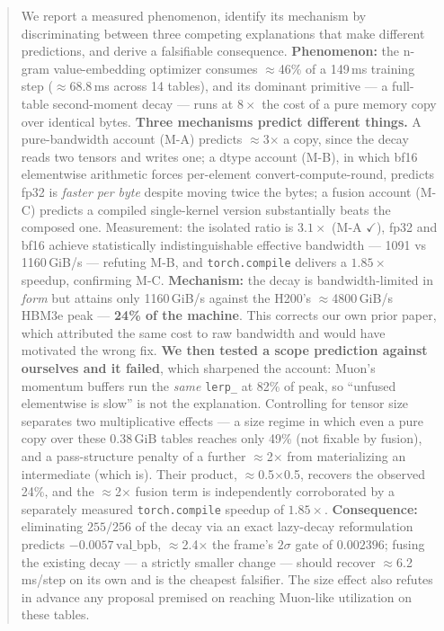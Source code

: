 \documentclass{article}
\newcommand{\vb}{\mathrm{val\_bpb}}
\begin{document}
\printAffiliationsAndNotice{}

\begin{abstract}
We report a measured phenomenon, identify its mechanism by discriminating between three competing explanations that make different predictions, and derive a falsifiable consequence. \textbf{Phenomenon:} the n-gram value-embedding optimizer consumes $\approx$46\% of a 149\,ms training step ($\approx$68.8\,ms across 14 tables), and its dominant primitive --- a full-table second-moment decay --- runs at $8\times$ the cost of a pure memory copy over identical bytes. \textbf{Three mechanisms predict different things.} A pure-bandwidth account (M-A) predicts $\approx$3$\times$ a copy, since the decay reads two tensors and writes one; a dtype account (M-B), in which bf16 elementwise arithmetic forces per-element convert-compute-round, predicts fp32 is \emph{faster per byte} despite moving twice the bytes; a fusion account (M-C) predicts a compiled single-kernel version substantially beats the composed one. Measurement: the isolated ratio is $3.1\times$ (M-A $\checkmark$), fp32 and bf16 achieve statistically indistinguishable effective bandwidth --- 1091 vs 1160\,GiB/s --- refuting M-B, and \texttt{torch.compile} delivers a $1.85\times$ speedup, confirming M-C. \textbf{Mechanism:} the decay is bandwidth-limited in \emph{form} but attains only 1160\,GiB/s against the H200's $\approx$4800\,GiB/s HBM3e peak --- \textbf{24\% of the machine}. This corrects our own prior paper, which attributed the same cost to raw bandwidth and would have motivated the wrong fix. \textbf{We then tested a scope prediction against ourselves and it failed}, which sharpened the account: Muon's momentum buffers run the \emph{same} \texttt{lerp\_} at 82\% of peak, so ``unfused elementwise is slow'' is not the explanation. Controlling for tensor size separates two multiplicative effects --- a size regime in which even a pure copy over these 0.38\,GiB tables reaches only 49\% (not fixable by fusion), and a pass-structure penalty of a further $\approx$2$\times$ from materializing an intermediate (which is). Their product, $\approx$0.5$\times$0.5, recovers the observed 24\%, and the $\approx$2$\times$ fusion term is independently corroborated by a separately measured \texttt{torch.compile} speedup of $1.85\times$. \textbf{Consequence:} eliminating $255/256$ of the decay via an exact lazy-decay reformulation predicts $-0.0057$\,$\vb$, $\approx$2.4$\times$ the frame's $2\sigma$ gate of $0.002396$; fusing the existing decay --- a strictly smaller change --- should recover $\approx$6.2\,ms/step on its own and is the cheapest falsifier. The size effect also refutes in advance any proposal premised on reaching Muon-like utilization on these tables.

\end{abstract}
\end{document}
